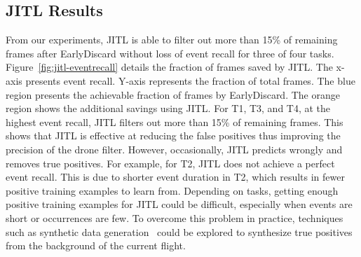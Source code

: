 \subsection{JITL Results}

From our experiments, JITL is able to filter out more than 15\% of remaining
frames after EarlyDiscard without loss of event recall for three of four tasks.
Figure~\ref{fig:jitl-eventrecall} details the fraction of frames saved by JITL.
The x-axis presents event recall. Y-axis represents the fraction of total
frames. The blue region presents the achievable fraction of frames by
EarlyDiscard. The orange region shows the additional savings using JITL. For T1,
T3, and T4, at the highest event recall, JITL filters out more than 15\% of
remaining frames. This shows that JITL is effective at reducing the false
positives thus improving the precision of the drone filter. However,
occasionally, JITL predicts wrongly and removes true positives. For example, for
T2, JITL does not achieve a perfect event recall. This is due to shorter event
duration in T2, which results in fewer positive training examples to learn
from. Depending on tasks, getting enough positive training examples for JITL
could be difficult, especially when events are short or occurrences are few. To
overcome this problem in practice, techniques such as synthetic data
generation~\cite{Dwibedi2017} could be explored to synthesize true positives
from the background of the current flight.
